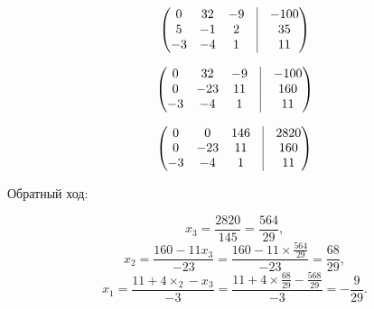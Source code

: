 \documentclass[10pt, a4paper, titlepage]{article}
\begin{document}
\begin{equation*}
    \begin{pmatrix}
        0 & 32 & -9 & \vrule & -100 \\
        5 & -1 & 2 & \vrule & 35 \\
        -3 & -4 & 1 & \vrule & 11
    \end{pmatrix}
\end{equation*}

\begin{equation*}
    \begin{pmatrix}
        0 & 32 & -9 & \vrule & -100 \\
        0 & -23 & 11 & \vrule & 160 \\
        -3 & -4 & 1 & \vrule & 11
    \end{pmatrix}
\end{equation*}

\begin{equation*}
    \begin{pmatrix}
        0 & 0 & 146 & \vrule & 2820 \\
        0 & -23 & 11 & \vrule & 160 \\
        -3 & -4 & 1 & \vrule & 11
    \end{pmatrix}
\end{equation*}


Обратный ход:

$$x_3=\frac{2820}{145}=\frac{564}{29},$$
$$x_2=\frac{160-11x_3}{-23}=\frac{160-11\times\frac{564}{29}}{-23}=\frac{68}{29},$$
$$x_1=\frac{11+4\times_2-x_3}{-3}=\frac{11+4\times\frac{68}{29}-\frac{568}{29}}{-3}=-\frac{9}{29}.$$
\end{document}
